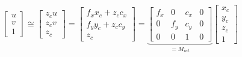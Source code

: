 \begin{equation}
    \begin{bmatrix}
        u \\ v \\ 1
    \end{bmatrix}
    \cong
    \begin{bmatrix}
        z_c u \\ z_c v \\ z_c
    \end{bmatrix}
    =
    \begin{bmatrix}
        f_x x_c + z_c c_x \\ f_y y_c + z_c c_y \\ z_c
    \end{bmatrix}
    =
    \underbrace{
        \begin{bmatrix}
            f_x & 0   & c_x & 0 \\
            0   & f_y & c_y & 0 \\
            0   & 0   & 1   & 0
        \end{bmatrix}
    }_{=M_{int}}
    \begin{bmatrix}
        x_c \\ y_c \\ z_c \\ 1
    \end{bmatrix}
\end{equation}
